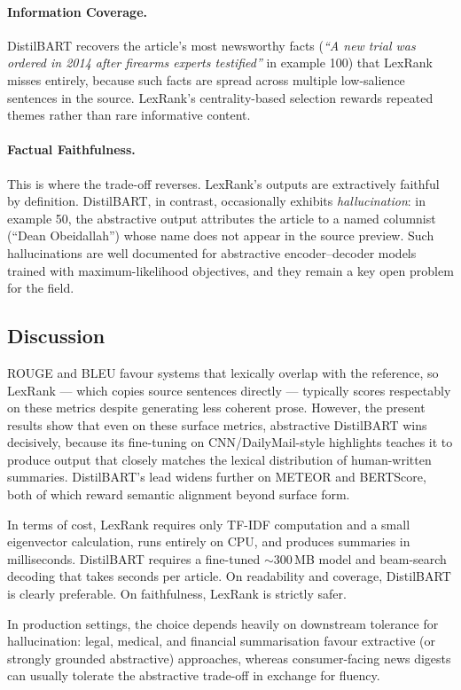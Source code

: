 \paragraph{Information Coverage.}
DistilBART recovers the article's most newsworthy facts (\textit{``A new
trial was ordered in 2014 after firearms experts testified''} in example
100) that LexRank misses entirely, because such facts are spread across
multiple low-salience sentences in the source. LexRank's centrality-based
selection rewards repeated themes rather than rare informative content.

\paragraph{Factual Faithfulness.}
This is where the trade-off reverses. LexRank's outputs are extractively
faithful by definition. DistilBART, in contrast, occasionally exhibits
\emph{hallucination}: in example 50, the abstractive output attributes
the article to a named columnist (``Dean Obeidallah'') whose name does
not appear in the source preview. Such hallucinations are well
documented for abstractive encoder–decoder models trained with
maximum-likelihood objectives, and they remain a key open problem for
the field.

\subsection{Discussion}

ROUGE and BLEU favour systems that lexically overlap with the reference,
so LexRank --- which copies source sentences directly --- typically
scores respectably on these metrics despite generating less coherent
prose. However, the present results show that even on these surface
metrics, abstractive DistilBART wins decisively, because its
fine-tuning on CNN/DailyMail-style highlights teaches it to produce
output that closely matches the lexical distribution of human-written
summaries. DistilBART's lead widens further on METEOR and BERTScore,
both of which reward semantic alignment beyond surface form.

In terms of cost, LexRank requires only TF-IDF computation and a small
eigenvector calculation, runs entirely on CPU, and produces summaries
in milliseconds. DistilBART requires a fine-tuned $\sim$300\,MB model
and beam-search decoding that takes seconds per article. On readability
and coverage, DistilBART is clearly preferable. On faithfulness,
LexRank is strictly safer.

In production settings, the choice depends heavily on downstream
tolerance for hallucination: legal, medical, and financial
summarisation favour extractive (or strongly grounded abstractive)
approaches, whereas consumer-facing news digests can usually tolerate
the abstractive trade-off in exchange for fluency.